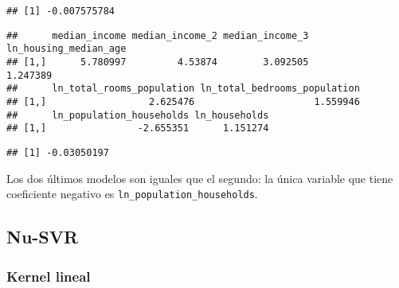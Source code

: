 \documentclass[
]{article}
\newenvironment{Shaded}{\begin{snugshade}}{\end{snugshade}}
\newcommand{\DecValTok}[1]{\textcolor[rgb]{0.00,0.00,0.81}{#1}}
\newcommand{\KeywordTok}[1]{\textcolor[rgb]{0.13,0.29,0.53}{\textbf{#1}}}
\newcommand{\NormalTok}[1]{#1}
\newcommand{\OperatorTok}[1]{\textcolor[rgb]{0.81,0.36,0.00}{\textbf{#1}}}
\newcommand{\StringTok}[1]{\textcolor[rgb]{0.31,0.60,0.02}{#1}}
\begin{document}
\begin{Shaded}
\end{Shaded}

\begin{verbatim}
## [1] -0.007575784
\end{verbatim}

\begin{Shaded}
\end{Shaded}

\begin{verbatim}
##      median_income median_income_2 median_income_3 ln_housing_median_age
## [1,]      5.780997         4.53874        3.092505              1.247389
##      ln_total_rooms_population ln_total_bedrooms_population
## [1,]                  2.625476                     1.559946
##      ln_population_households ln_households
## [1,]                -2.655351      1.151274
\end{verbatim}

\begin{Shaded}
\end{Shaded}

\begin{verbatim}
## [1] -0.03050197
\end{verbatim}

Los dos últimos modelos son iguales que el segundo: la única variable
que tiene coeficiente negativo es \texttt{ln\_population\_households}.

\hypertarget{nu-svr}{%
\subsection{Nu-SVR}\label{nu-svr}}

\hypertarget{kernel-lineal-1}{%
\subsubsection{Kernel lineal}\label{kernel-lineal-1}}
\end{document}
